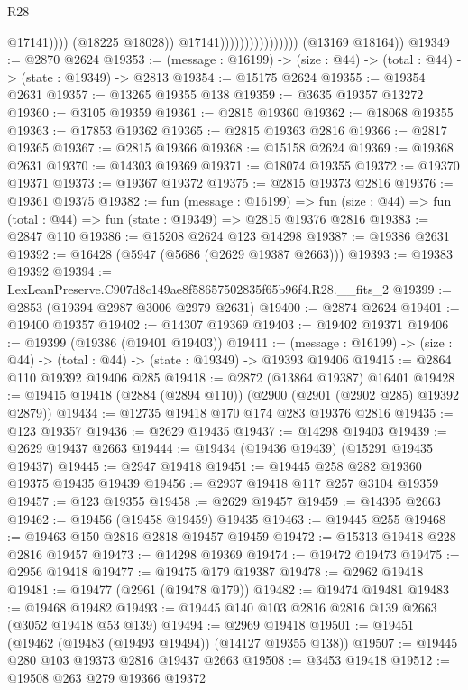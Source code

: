 \begin{lexlean}{R28}
\begin{coremodule}
                                                @17141))))
                                        (@18225 @18028))
                                      @17141))))))))))))))))
      (@13169 @18164))
@19349 := @2870 @2624
@19353 := (message : @16199) -> (size : @44) -> (total : @44) -> (state : @19349) -> @2813
@19354 := @15175 @2624
@19355 := @19354 @2631
@19357 := @13265 @19355 @138
@19359 := @3635 @19357 @13272
@19360 := @3105 @19359
@19361 := @2815 @19360
@19362 := @18068 @19355
@19363 := @17853 @19362
@19365 := @2815 @19363 @2816
@19366 := @2817 @19365
@19367 := @2815 @19366
@19368 := @15158 @2624
@19369 := @19368 @2631
@19370 := @14303 @19369
@19371 := @18074 @19355
@19372 := @19370 @19371
@19373 := @19367 @19372
@19375 := @2815 @19373 @2816
@19376 := @19361 @19375
@19382 := fun (message : @16199) =>
  fun (size : @44) => fun (total : @44) => fun (state : @19349) => @2815 @19376 @2816
@19383 := @2847 @110
@19386 := @15208 @2624 @123 @14298
@19387 := @19386 @2631
@19392 := @16428 (@5947 (@5686 (@2629 @19387 @2663)))
@19393 := @19383 @19392
@19394 := LexLeanPreserve.C907d8c149ae8f58657502835f65b96f4.R28.__fits_2
@19399 := @2853 (@19394 @2987 @3006 @2979 @2631)
@19400 := @2874 @2624
@19401 := @19400 @19357
@19402 := @14307 @19369
@19403 := @19402 @19371
@19406 := @19399 (@19386 (@19401 @19403))
@19411 := (message : @16199) -> (size : @44) -> (total : @44) -> (state : @19349) -> @19393 @19406
@19415 := @2864 @110 @19392 @19406 @285
@19418 := @2872 (@13864 @19387) @16401
@19428 := @19415 @19418 (@2884 (@2894 @110)) (@2900 (@2901 (@2902 @285) @19392 @2879))
@19434 := @12735 @19418 @170 @174 @283 @19376 @2816
@19435 := @123 @19357
@19436 := @2629 @19435
@19437 := @14298 @19403
@19439 := @2629 @19437 @2663
@19444 := @19434 (@19436 @19439) (@15291 @19435 @19437)
@19445 := @2947 @19418
@19451 := @19445 @258 @282 @19360 @19375 @19435 @19439
@19456 := @2937 @19418 @117 @257 @3104 @19359
@19457 := @123 @19355
@19458 := @2629 @19457
@19459 := @14395 @2663
@19462 := @19456 (@19458 @19459) @19435
@19463 := @19445 @255
@19468 := @19463 @150 @2816 @2818 @19457 @19459
@19472 := @15313 @19418 @228 @2816 @19457
@19473 := @14298 @19369
@19474 := @19472 @19473
@19475 := @2956 @19418
@19477 := @19475 @179 @19387
@19478 := @2962 @19418
@19481 := @19477 (@2961 (@19478 @179))
@19482 := @19474 @19481
@19483 := @19468 @19482
@19493 := @19445 @140 @103 @2816 @2816 @139 @2663 (@3052 @19418 @53 @139)
@19494 := @2969 @19418
@19501 := @19451 (@19462 (@19483 (@19493 @19494)) (@14127 @19355 @138))
@19507 := @19445 @280 @103 @19373 @2816 @19437 @2663
@19508 := @3453 @19418
@19512 := @19508 @263 @279 @19366 @19372

\end{coremodule}
\end{lexlean}
